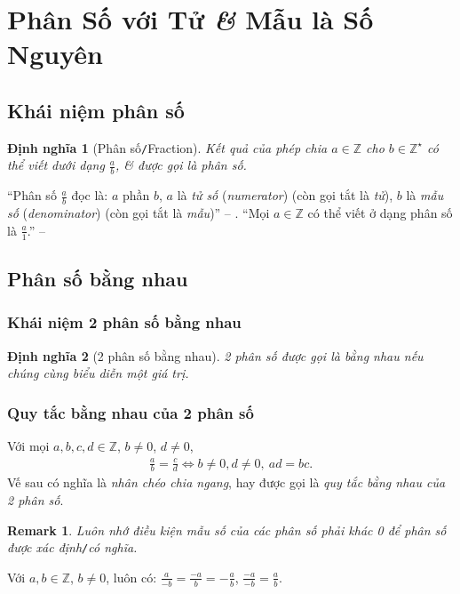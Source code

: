 \documentclass[oneside]{book}
\numberwithin{equation}{section}
\newtheorem{dinhnghia}{Định nghĩa}[section]
\newtheorem{remark}{Remark}[section]
\begin{document}
\section{Phân Số với Tử \textit{\&} Mẫu là Số Nguyên}

\subsection{Khái niệm phân số}

\begin{dinhnghia}[Phân số\texttt{/}Fraction]
	Kết quả của phép chia $a\in\mathbb{Z}$ cho $b\in\mathbb{Z}^\star$ có thể viết dưới dạng $\frac{a}{b}$, \textit{\&} được gọi là \emph{phân số}.
\end{dinhnghia}
``Phân số $\frac{a}{b}$ đọc là: $a$ phần $b$, $a$ là \textit{tử số} (\textit{numerator}) (còn gọi tắt là \textit{tử}), $b$ là \textit{mẫu số} (\textit{denominator}) (còn gọi tắt là \textit{mẫu})'' -- \cite[p.  25]{Thai_Anh_Dat_Ha_Loan_Nam_Quang_Toan_6_tap_2}. ``Mọi $a\in\mathbb{Z}$ có thể viết ở dạng phân số là $\frac{a}{1}$.'' -- \cite[p.  26]{Thai_Anh_Dat_Ha_Loan_Nam_Quang_Toan_6_tap_2}

\subsection{Phân số bằng nhau}

\subsubsection{Khái niệm 2 phân số bằng nhau}
\begin{dinhnghia}[2 phân số bằng nhau]
	2 phân số được gọi là \emph{bằng nhau} nếu chúng cùng biểu diễn một giá trị.
\end{dinhnghia}

\subsubsection{Quy tắc bằng nhau của 2 phân số}
Với mọi $a,b,c,d\in\mathbb{Z}$, $b\ne 0$, $d\ne 0$,
\begin{align*}
	\boxed{\frac{a}{b} = \frac{c}{d}\Leftrightarrow b\ne 0, d\ne 0,\ ad = bc.}
\end{align*}
Vế sau có nghĩa là \textit{nhân chéo chia ngang}, hay được gọi là \textit{quy tắc bằng nhau của 2 phân số}.

\begin{remark}
	Luôn nhớ điều kiện mẫu số của các phân số phải khác 0 để phân số được xác định\emph{\texttt{/}}có nghĩa.
\end{remark}
Với $a,b\in\mathbb{Z}$, $b\ne 0$, luôn có: $\frac{a}{-b} = \frac{-a}{b} = -\frac{a}{b}$, $\frac{-a}{-b} = \frac{a}{b}$.
\end{document}

